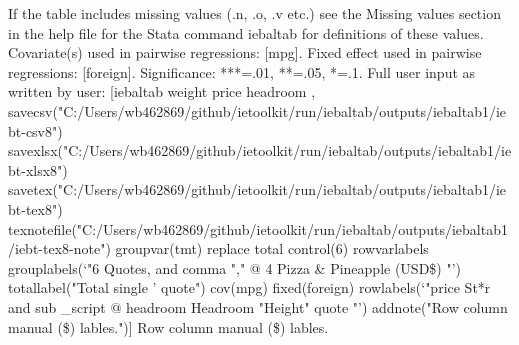 If the table includes missing values (.n, .o, .v etc.) see the Missing values section in the help file for the Stata command iebaltab for definitions of these values. Covariate(s) used in pairwise regressions: [mpg]. Fixed effect used in pairwise regressions: [foreign]. Significance: ***=.01, **=.05, *=.1. Full user input as written by user: [iebaltab weight price headroom , savecsv("C:/Users/wb462869/github/ietoolkit/run/iebaltab/outputs/iebaltab1/iebt-csv8") savexlsx("C:/Users/wb462869/github/ietoolkit/run/iebaltab/outputs/iebaltab1/iebt-xlsx8") savetex("C:/Users/wb462869/github/ietoolkit/run/iebaltab/outputs/iebaltab1/iebt-tex8") texnotefile("C:/Users/wb462869/github/ietoolkit/run/iebaltab/outputs/iebaltab1/iebt-tex8-note") groupvar(tmt) replace total control(6) rowvarlabels grouplabels(`"6 Quotes, and comma "," @ 4 Pizza \& Pineapple (USD\$) "') totallabel("Total single ' quote") cov(mpg) fixed(foreign) rowlabels(`"price St*r and sub \_script @ headroom Headroom "Height" quote "') addnote("Row column manual (\$) lables.")] Row column manual (\$) lables.
